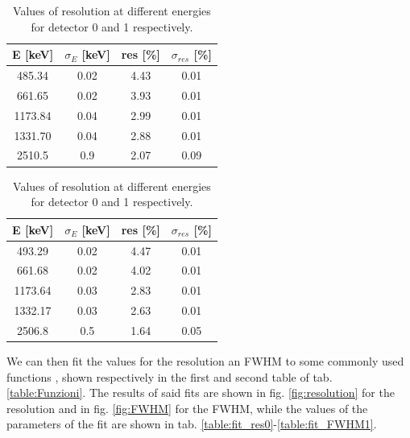 \begin{table}[h]
    \begin{subtable}
        \centering
        \begin{tabular}{|c|c|c|c|}
         \hline
        E [keV] & $\sigma_{E} $ [keV] & res [\%] &$\sigma_{res}$ [\%]  \\
        \hline
        485.34 & 0.02 & 4.43 & 0.01 \\
        661.65 & 0.02 & 3.93 & 0.01 \\
        1173.84 &0.04& 2.99 & 0.01\\
        1331.70 & 0.04&2.88& 0.01\\
        2510.5 & 0.9&2.07& 0.09\\
        \hline
        \end{tabular}
    \end{subtable}
    \qquad
    \qquad
    \qquad
    \begin{subtable}
        \centering
        \begin{tabular}{|c|c|c|c|}
          \hline
        E [keV] & $\sigma_{E} $ [keV] & res [\%] &$\sigma_{res}$ [\%]  \\
        \hline
        493.29 & 0.02 &4.47 & 0.01 \\
        661.68 & 0.02 & 4.02 & 0.01 \\
        1173.64 &0.03& 2.83 & 0.01\\
        1332.17 & 0.03&2.63& 0.01\\
        2506.8 & 0.5&1.64& 0.05\\
        \hline
        \end{tabular}
     \end{subtable}
     \caption{Values of resolution at different energies for detector 0 and 1 respectively.}
     \label{tab:res}
\end{table}

We can then fit the values for the resolution an FWHM to some commonly used functions \cite{gilmore_2008}, shown respectively in the first and second table of tab. \ref{table:Funzioni}.
The results of said fits are shown in fig. \ref{fig:resolution} for the resolution and in fig. \ref{fig:FWHM} for the FWHM, while the values of the parameters of the fit are shown in tab. \ref{table:fit_res0}-\ref{table:fit_FWHM1}.

